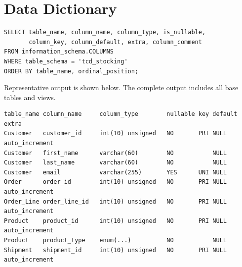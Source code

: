 \section{Data Dictionary}

{\scriptsize
\begin{verbatim}
SELECT table_name, column_name, column_type, is_nullable,
       column_key, column_default, extra, column_comment
FROM information_schema.COLUMNS
WHERE table_schema = 'tcd_stocking'
ORDER BY table_name, ordinal_position;
\end{verbatim}
}

Representative output is shown below. The complete output includes all base tables and views.

{\scriptsize
\begin{verbatim}
table_name column_name     column_type        nullable key default extra
Customer   customer_id     int(10) unsigned   NO       PRI NULL    auto_increment
Customer   first_name      varchar(60)        NO           NULL
Customer   last_name       varchar(60)        NO           NULL
Customer   email           varchar(255)       YES      UNI NULL
Order      order_id        int(10) unsigned   NO       PRI NULL    auto_increment
Order_Line order_line_id   int(10) unsigned   NO       PRI NULL    auto_increment
Product    product_id      int(10) unsigned   NO       PRI NULL    auto_increment
Product    product_type    enum(...)          NO           NULL
Shipment   shipment_id     int(10) unsigned   NO       PRI NULL    auto_increment
\end{verbatim}
}
